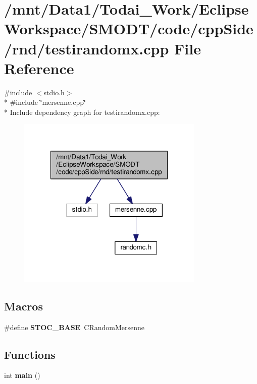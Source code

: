 \section{/mnt/\-Data1/\-Todai\-\_\-\-Work/\-Eclipse\-Workspace/\-S\-M\-O\-D\-T/code/cpp\-Side/rnd/testirandomx.cpp File Reference}
\label{rnd_2testirandomx_8cpp}
{\ttfamily \#include $<$stdio.\-h$>$}\\*
{\ttfamily \#include \char`\"{}mersenne.\-cpp\char`\"{}}\\*
Include dependency graph for testirandomx.\-cpp\-:
\nopagebreak
\begin{figure}[H]
\begin{center}
\leavevmode
\includegraphics[width=252pt]{rnd_2testirandomx_8cpp__incl}
\end{center}
\end{figure}
\subsection*{Macros}
\begin{DoxyCompactItemize}
\item 
\#define {\bf S\-T\-O\-C\-\_\-\-B\-A\-S\-E}~C\-Random\-Mersenne
\end{DoxyCompactItemize}
\subsection*{Functions}
\begin{DoxyCompactItemize}
\item 
int {\bf main} ()
\end{DoxyCompactItemize}


